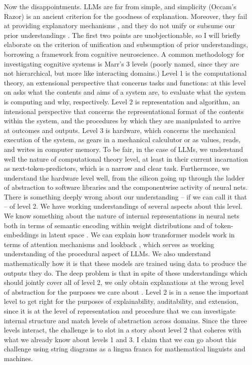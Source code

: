 \begin{fullwidth}
\begin{multicols}{2}
Now the disappointments. LLMs are far from simple, and simplicity (Occam's Razor) is an ancient criterion for the goodness of explanation. Moreover, they fail at providing explanatory mechanisms \citep{}, and they do not unify or subsume our prior understandings \citep{}. The first two points are unobjectionable, so I will briefly elaborate on the criterion of unification and subsumption of prior understandings, borrowing a framework from cognitive neuroscience. A common methodology for investigating cognitive systems is Marr's 3 levels \citep{} (poorly named, since they are not hierarchical, but more like interacting domains.) Level 1 is the computational theory, an extensional perspective that concerns tasks and functions: at this level on asks what the contents and aims of a system are, to evaluate what the system is computing and why, respectively. Level 2 is representation and algorithm, an intensional perspective that concerns the representational format of the contents within the system, and the procedures by which they are manipulated to arrive at outcomes and outputs. Level 3 is hardware, which concerns the mechanical execution of the system, as gears in a mechanical calculutor or as values, reads, and writes in computer memory. To be fair, in the case of LLMs, we understand well the nature of computational theory level, at least in their current incarnation as next-token-predictors, which is a narrow and clear task. Furthermore, we understand the hardware level well, from the silicon going up through the ladder of abstraction to software libraries and the componentwise activity of neural nets. There is something deeply wrong about our understanding -- if we can call it that -- of level 2. We have working understandings of several aspects about this level. We know something about the nature of internal representations in neural nets both in terms of semantic encoding within weight distributions \citep{} and of token-embeddings in latent space \citep{}. We can explain how transformer models work in terms of attention mechanisms and lookback \citep{}, which serves as working understanding of the procedural aspect of LLMs. We also understand mathematically how it is that these models are trained using data to produce the outputs they do. The deep problem is that in spite of these understandings which should jointly cover all of level 2, we only obtain explanations at the wrong level of abstraction for the purposes we care about \citep{}. Level 2 is in a sense the important level to get right for the purposes of explainability, auditability, and extension, since it is at the level of representation and procedure that we can investigate internal structure and match levels of abstraction across domains. Since the three levels interact, the challenge is to slot in a story about level 2 that coheres with what we already know about levels 1 and 3. I claim that we can go about this challenge using string diagrams as a lingua franca for mathematical linguists and machines.

\end{multicols}
\end{fullwidth}

